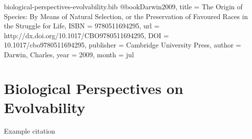 \begin{bibunit}

\begin{filecontents*}[overwrite]{biological-perspectives-evolvability.bib}
@book{Darwin2009,
  title = {The Origin of Species: By Means of Natural Selection,  or the Preservation of Favoured Races in the Struggle for Life},
  ISBN = {9780511694295},
  url = {http://dx.doi.org/10.1017/CBO9780511694295},
  DOI = {10.1017/cbo9780511694295},
  publisher = {Cambridge University Press},
  author = {Darwin,  Charles},
  year = {2009},
  month = jul 
}
\end{filecontents*} 

\section{Biological Perspectives on Evolvability}
\label{sec:evolvability}

Example citation \citep{Darwin2009}

    
\end{bibunit}
